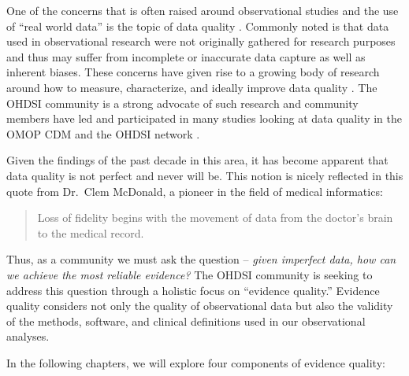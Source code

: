 \documentclass[11pt]{book}
\theoremstyle{definition}
\theoremstyle{definition}
\theoremstyle{definition}
\theoremstyle{remark}
\begin{document}
One of the concerns that is often raised around observational studies and the use of ``real world data'' is the topic of data quality \citep{botsis2010secondary, hersh2013caveats, sherman2016real}. Commonly noted is that data used in observational research were not originally gathered for research purposes and thus may suffer from incomplete or inaccurate data capture as well as inherent biases. These concerns have given rise to a growing body of research around how to measure, characterize, and ideally improve data quality \citep{kahn2012pragmatic, liaw2013towards, weiskopf2013methods}. The OHDSI community is a strong advocate of such research and community members have led and participated in many studies looking at data quality in the OMOP CDM and the OHDSI network \citep{huser_multisite_2016, kahn_transparent_2015, callahan2017comparison, yoon_2016}.  

Given the findings of the past decade in this area, it has become apparent that data quality is not perfect and never will be. This notion is nicely reflected in this quote from Dr.~Clem McDonald, a pioneer in the field of medical informatics:

\begin{quote}
Loss of fidelity begins with the movement of data from the doctor's brain to the medical record. 
\end{quote}

Thus, as a community we must ask the question -- \emph{given imperfect data, how can we achieve the most reliable evidence?} The OHDSI community is seeking to address this question through a holistic focus on ``evidence quality.'' Evidence quality considers not only the quality of observational data but also the validity of the methods, software, and clinical definitions used in our observational analyses.  

In the following chapters, we will explore four components of evidence quality:
\end{document}

